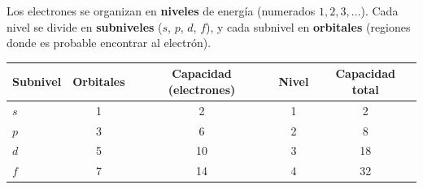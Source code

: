\documentclass[12pt, letterpaper]{article}
\begin{document}
\begin{cuadroteoria}
  Los electrones se organizan en \textbf{niveles} de energía (numerados $1, 2, 3, \ldots$). Cada nivel se divide en \textbf{subniveles} ($s$, $p$, $d$, $f$), y cada subnivel en \textbf{orbitales} (regiones donde es probable encontrar al electrón).
  \begin{center}
    \begin{tabular}{lcccc}
      \toprule
      Subnivel & Orbitales & Capacidad (electrones) & Nivel & Capacidad total \\
      \midrule
      $s$      & 1         & 2                      & 1     & 2               \\
      $p$      & 3         & 6                      & 2     & 8               \\
      $d$      & 5         & 10                     & 3     & 18              \\
      $f$      & 7         & 14                     & 4     & 32              \\
      \bottomrule
    \end{tabular}
  \end{center}
\end{cuadroteoria}
\end{document}
